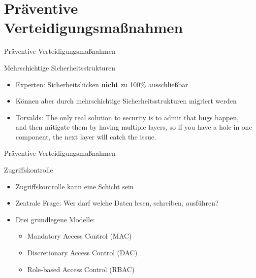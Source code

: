 \newcommand{\gqq}[1]{\glqq#1\grqq}

\section{Präventive Verteidigungsmaßnahmen}

\begin{frame}{Präventive Verteidigungsmaßnahmen}
        \begin{block}{Mehrschichtige Sicherheitsstrukturen}
                \begin{itemize}[<+->]
                        \item Experten: Sicherheitslücken \textbf{nicht} zu 100\% ausschließbar
                        \item Können aber durch mehrschichtige Sicherheitsstrukturen migriert werden
                        \item Torvalds: \gqq{The only real solution to security is to admit that bugs happen, and then mitigate them by having multiple layers, so if you have a hole in one component, the next layer will catch the issue.} \footnotemark 
                \end{itemize}
        \end{block}
        
\end{frame}

\begin{frame}{Präventive Verteidigungsmaßnahmen}
        \begin{block}{Zugriffskontrolle}
                \begin{itemize}[<+->]
                        \item Zugriffskontrolle kann eine Schicht sein
                        \item Zentrale Frage: Wer darf welche Daten lesen, schreiben, ausführen?
                        \item Drei grundlegene Modelle:
                        \begin{itemize}[<+->]
                                \item Mandatory Access Control (MAC)
                                \item Discretionary Access Control (DAC)
                                \item Role-based Access Control (RBAC)
                        \end{itemize}
                \end{itemize}
        \end{block}
\end{frame}

